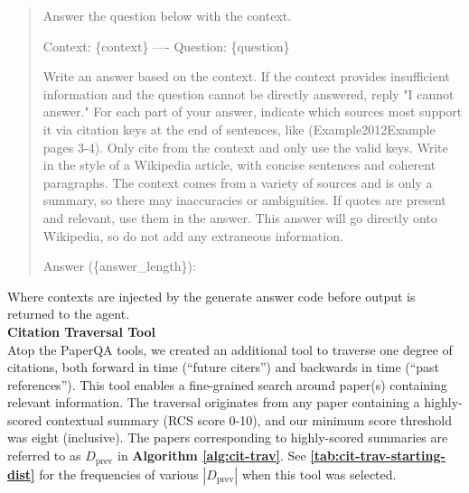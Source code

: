 \begin{quote}
Answer the question below with the context.

Context:
\{context\}
----
Question: \{question\}

Write an answer based on the context. If the context provides insufficient information and the question cannot be directly answered, reply "I cannot answer." For each part of your answer, indicate which sources most support it via citation keys at the end of sentences, like (Example2012Example pages 3-4). Only cite from the context and only use the valid keys. Write in the style of a Wikipedia article, with concise sentences and coherent paragraphs. The context comes from a variety of sources and is only a summary, so there may inaccuracies or ambiguities. If quotes are present and relevant, use them in the answer. This answer will go directly onto Wikipedia, so do not add any extraneous information.

Answer (\{answer\_length\}):
\end{quote}

Where contexts are injected by the generate answer code before output is returned to the agent. \\

\textbf{Citation Traversal Tool} \\

Atop the PaperQA\cite{lala2023paperqa} tools, we created an additional tool to traverse one degree of citations, both forward in time (``future citers'') and backwards in time (``past references''). This tool enables a fine-grained search around paper(s) containing relevant information. The traversal originates from any paper containing a highly-scored contextual summary (RCS score 0-10), and our minimum score threshold was eight (inclusive). The papers corresponding to highly-scored summaries are referred to as $D_\text{prev}$ in \textbf{Algorithm \ref{alg:cit-trav}}. See \textbf{\autoref{tab:cit-trav-starting-dist}} for the frequencies of various $|D_\text{prev}|$ when this tool was selected.

